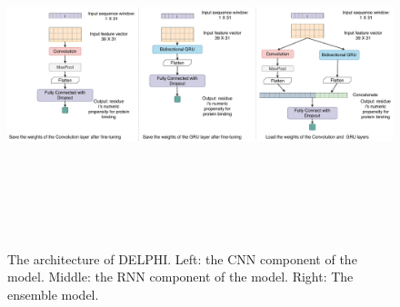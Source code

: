 \begin{figure}
\centering
\includegraphics[width=\textwidth, height=10cm]{img/Model_architecture.pdf}
\caption[The architecture of DELPHI]{The architecture of DELPHI. Left: the CNN component of the model. Middle: the RNN component of the model. Right: The ensemble model. 
  \label{fig_architecture}}
\end{figure}
